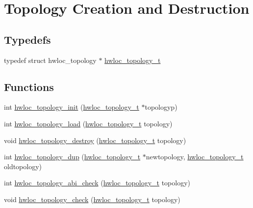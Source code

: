\hypertarget{a00186}{}\section{Topology Creation and Destruction}
\label{a00186}
\subsection*{Typedefs}
\begin{DoxyCompactItemize}
\item 
typedef struct hwloc\+\_\+topology $\ast$ \hyperlink{a00186_ga9d1e76ee15a7dee158b786c30b6a6e38}{hwloc\+\_\+topology\+\_\+t}
\end{DoxyCompactItemize}
\subsection*{Functions}
\begin{DoxyCompactItemize}
\item 
int \hyperlink{a00186_ga03fd4a16d8b9ee1ffc32b25fd2f6bdfa}{hwloc\+\_\+topology\+\_\+init} (\hyperlink{a00186_ga9d1e76ee15a7dee158b786c30b6a6e38}{hwloc\+\_\+topology\+\_\+t} $\ast$topologyp)
\item 
int \hyperlink{a00186_gabdf58d87ad77f6615fccdfe0535ff826}{hwloc\+\_\+topology\+\_\+load} (\hyperlink{a00186_ga9d1e76ee15a7dee158b786c30b6a6e38}{hwloc\+\_\+topology\+\_\+t} topology)
\item 
void \hyperlink{a00186_ga9f34a640b6fd28d23699d4d084667b15}{hwloc\+\_\+topology\+\_\+destroy} (\hyperlink{a00186_ga9d1e76ee15a7dee158b786c30b6a6e38}{hwloc\+\_\+topology\+\_\+t} topology)
\item 
int \hyperlink{a00186_ga62a161fc5e6f120344dc69a7bee4e587}{hwloc\+\_\+topology\+\_\+dup} (\hyperlink{a00186_ga9d1e76ee15a7dee158b786c30b6a6e38}{hwloc\+\_\+topology\+\_\+t} $\ast$newtopology, \hyperlink{a00186_ga9d1e76ee15a7dee158b786c30b6a6e38}{hwloc\+\_\+topology\+\_\+t} oldtopology)
\item 
int \hyperlink{a00186_ga0647ae66458fe68172eb5a320042f870}{hwloc\+\_\+topology\+\_\+abi\+\_\+check} (\hyperlink{a00186_ga9d1e76ee15a7dee158b786c30b6a6e38}{hwloc\+\_\+topology\+\_\+t} topology)
\item 
void \hyperlink{a00186_gaf6746bc3a558ef1ac8348b4491d091b5}{hwloc\+\_\+topology\+\_\+check} (\hyperlink{a00186_ga9d1e76ee15a7dee158b786c30b6a6e38}{hwloc\+\_\+topology\+\_\+t} topology)
\end{DoxyCompactItemize}


